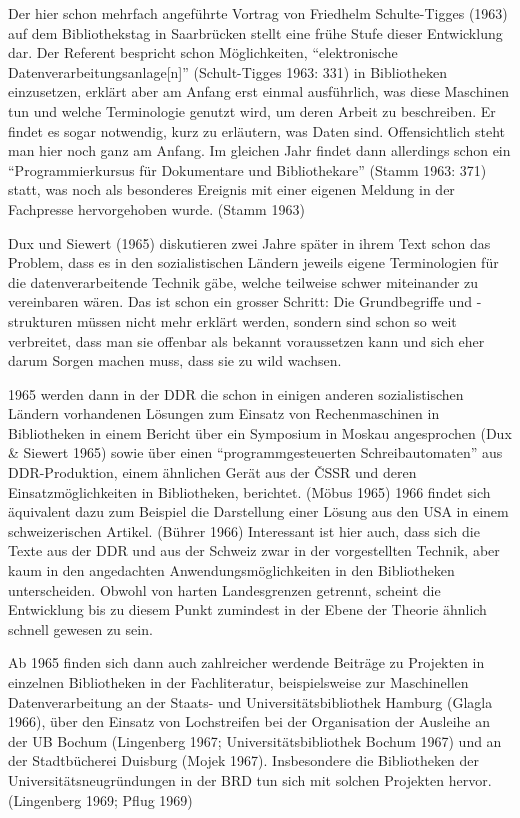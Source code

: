 \documentclass[a4paper,
fontsize=11pt,
oneside,
numbers=noperiodatend,
parskip=half-,
bibliography=totoc,
final
]{scrartcl}
\begin{document}
Der hier schon mehrfach angeführte Vortrag von Friedhelm Schulte-Tigges
(1963) auf dem Bibliothekstag in Saarbrücken stellt eine frühe Stufe
dieser Entwicklung dar. Der Referent bespricht schon Möglichkeiten,
\enquote{elektronische Datenverarbeitungsanlage{[}n{]}} (Schult-Tigges 1963:
331) in Bibliotheken einzusetzen, erklärt aber am Anfang erst einmal
ausführlich, was diese Maschinen tun und welche Terminologie genutzt
wird, um deren Arbeit zu beschreiben. Er findet es sogar notwendig, kurz
zu erläutern, was Daten sind. Offensichtlich steht man hier noch ganz am
Anfang. Im gleichen Jahr findet dann allerdings schon ein
\enquote{Programmierkursus für Dokumentare und Bibliothekare} (Stamm 1963: 371)
statt, was noch als besonderes Ereignis mit einer eigenen Meldung in der
Fachpresse hervorgehoben wurde. (Stamm 1963)

Dux und Siewert (1965) diskutieren zwei Jahre später in ihrem Text schon
das Problem, dass es in den sozialistischen Ländern jeweils eigene
Terminologien für die datenverarbeitende Technik gäbe, welche teilweise
schwer miteinander zu vereinbaren wären. Das ist schon ein grosser
Schritt: Die Grundbegriffe und -strukturen müssen nicht mehr erklärt
werden, sondern sind schon so weit verbreitet, dass man sie offenbar als
bekannt voraussetzen kann und sich eher darum Sorgen machen muss, dass
sie zu wild wachsen.

1965 werden dann in der DDR die schon in einigen anderen sozialistischen
Ländern vorhandenen Lösungen zum Einsatz von Rechenmaschinen in
Bibliotheken in einem Bericht über ein Symposium in Moskau angesprochen
(Dux \& Siewert 1965) sowie über einen \enquote{programmgesteuerten
Schreibautomaten} aus DDR-Produktion, einem ähnlichen Gerät aus der ČSSR
und deren Einsatzmöglichkeiten in Bibliotheken, berichtet. (Möbus 1965)
1966 findet sich äquivalent dazu zum Beispiel die Darstellung einer
Lösung aus den USA in einem schweizerischen Artikel. (Bührer 1966)
Interessant ist hier auch, dass sich die Texte aus der DDR und aus der
Schweiz zwar in der vorgestellten Technik, aber kaum in den angedachten
Anwendungsmöglichkeiten in den Bibliotheken unterscheiden. Obwohl von
harten Landesgrenzen getrennt, scheint die Entwicklung bis zu diesem
Punkt zumindest in der Ebene der Theorie ähnlich schnell gewesen zu
sein.

Ab 1965 finden sich dann auch zahlreicher werdende Beiträge zu Projekten
in einzelnen Bibliotheken in der Fachliteratur, beispielsweise zur
Maschinellen Datenverarbeitung an der Staats- und Universitätsbibliothek
Hamburg (Glagla 1966), über den Einsatz von Lochstreifen bei der
Organisation der Ausleihe an der UB Bochum (Lingenberg 1967;
Universitätsbibliothek Bochum 1967) und an der Stadtbücherei Duisburg
(Mojek 1967). Insbesondere die Bibliotheken der
Universitätsneugründungen in der BRD tun sich mit solchen Projekten
hervor. (Lingenberg 1969; Pflug 1969)
\end{document}
